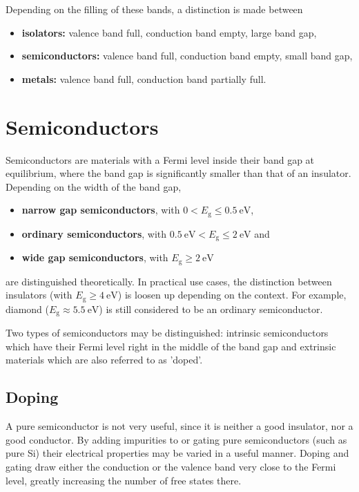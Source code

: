 Depending on the filling of these bands, a distinction is made between
\begin{itemize}
	\item \textbf{isolators:} valence band full, conduction band empty, large band gap,
	\item \textbf{semiconductors:} valence band full, conduction band empty, small band gap,
	\item \textbf{metals:} valence band full, conduction band partially full.
\end{itemize}

\section{Semiconductors}
Semiconductors are materials with a Fermi level inside their band gap at equilibrium, where the band gap is significantly smaller than that of an insulator.
Depending on the width of the band gap,
\begin{itemize}
	\item \textbf{narrow gap semiconductors}, with $0<E_\text{g}\leq\SI{0.5}{\eV}$,
	\item \textbf{ordinary semiconductors}, with $\SI{0.5}{\eV}<E_\text{g}\leq\SI{2}{\eV}$ and
	\item \textbf{wide gap semiconductors}, with $E_\text{g}\geq\SI{2}{\eV}$
\end{itemize}
are distinguished theoretically.
In practical use cases, the distinction between insulators (with $E_\text{g}\geq\SI{4}{\eV}$) is loosen up depending on the context.
For example, diamond ($E_\text{g}\approx\SI{5.5}{\eV}$) is still considered to be an ordinary semiconductor.

Two types of semiconductors may be distinguished: intrinsic semiconductors which have their Fermi level right in the middle of the band gap and extrinsic materials which are also referred to as 'doped'.

\subsection{Doping}
A pure semiconductor is not very useful, since it is neither a good insulator, nor a good conductor.
By adding impurities to or gating pure semiconductors (such as pure Si) their electrical properties may be varied in a useful manner.
Doping and gating draw either the conduction or the valence band very close to the Fermi level, greatly increasing the number of free states there.

